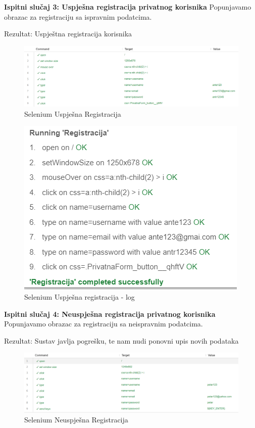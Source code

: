     \textbf{Ispitni slučaj 3: Uspješna registracija privatnog korisnika}
    Popunjavamo obrazac za registraciju sa ispravnim podatcima.
    
    Rezultat: Uspještna registracija korisnika

    \begin{figure}[H]
			\includegraphics[scale=0.5]{slike/UspjesnaRegistracija1.png}
			\centering
			\caption{Selenium Uspješna Registracija}
			\label{fig:promjene}
		          \end{figure}


\begin{figure}[H]
			\includegraphics[scale=0.8]{slike/UspjesnaRegistracija2.png}
			\centering
			\caption{Selenium Uspješna registracija - log}
			\label{fig:promjene}
		          \end{figure}

            \textbf{Ispitni slučaj 4: Neuspješna registracija privatnog korisnika}
    Popunjavamo obrazac za registraciju sa neispravnim podatcima.
    
    Rezultat: Sustav javlja pogrešku, te nam nudi ponovni upis novih podataka

    \begin{figure}[H]
			\includegraphics[scale=0.5]{slike/NeuspjesnaRegistracija2.png}
			\centering
			\caption{Selenium Neuspješna Registracija}
			\label{fig:promjene}
		          \end{figure}


